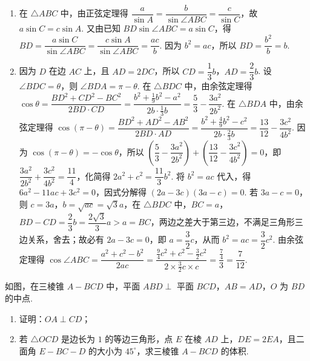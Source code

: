 \begin{solution}
\begin{enumerate}
    \item 在 \(\triangle ABC\) 中，由正弦定理得 \(\dfrac{a}{\sin A}=\dfrac{b}{\sin\angle ABC}=\dfrac{c}{\sin C}\)，故 \(a\sin C=c\sin A\). 又由已知 \(BD\sin\angle ABC=a\sin C\)，得 \(BD=\dfrac{a\sin C}{\sin\angle ABC}=\dfrac{c\sin A}{\sin\angle ABC}=\dfrac{ac}{b}\). 因为 \(b^2=ac\)，所以 \(BD=\dfrac{b^2}{b}=b\).
    \item 因为 \(D\) 在边 \(AC\) 上，且 \(AD=2DC\)，所以 \(CD=\dfrac13b\)，\(AD=\dfrac23b\). 设 \(\angle BDC=\theta\)，则 \(\angle BDA=\pi-\theta\). 在 \(\triangle BDC\) 中，由余弦定理得 \(\cos\theta=\dfrac{BD^2+CD^2-BC^2}{2BD\cdot CD}=\dfrac{b^2+\frac19b^2-a^2}{2b\cdot\frac13b}=\dfrac{5}{3}-\dfrac{3a^2}{2b^2}\). 在 \(\triangle BDA\) 中，由余弦定理得 \(\cos(\pi-\theta)=\dfrac{BD^2+AD^2-AB^2}{2BD\cdot AD}=\dfrac{b^2+\frac49b^2-c^2}{2b\cdot\frac23b}=\dfrac{13}{12}-\dfrac{3c^2}{4b^2}\). 因为 \(\cos(\pi-\theta)=-\cos\theta\)，所以 \(\left(\dfrac53-\dfrac{3a^2}{2b^2}\right)+\left(\dfrac{13}{12}-\dfrac{3c^2}{4b^2}\right)=0\)，即 \(\dfrac{3a^2}{2b^2}+\dfrac{3c^2}{4b^2}=\dfrac{11}{4}\)，化简得 \(2a^2+c^2=\dfrac{11}{3}b^2\). 将 \(b^2=ac\) 代入，得 \(6a^2-11ac+3c^2=0\)，因式分解得 \((2a-3c)(3a-c)=0\). 若 \(3a-c=0\)，则 \(c=3a\)，\(b=\sqrt{ac}=\sqrt3a\)，在 \(\triangle BDC\) 中，\(BC=a\)，\(BD-CD=\dfrac23b=\dfrac{2\sqrt3}{3}a>a=BC\)，两边之差大于第三边，不满足三角形三边关系，舍去；故必有 \(2a-3c=0\)，即 \(a=\dfrac32c\)，从而 \(b^2=ac=\dfrac32c^2\). 由余弦定理得 \(\cos\angle ABC=\dfrac{a^2+c^2-b^2}{2ac}=\dfrac{\frac94c^2+c^2-\frac32c^2}{2\times\frac32c\times c}=\dfrac{\frac74}{3}=\dfrac{7}{12}\).
\end{enumerate}
\end{solution}

\begin{problem}
如图，在三棱锥 \(A-BCD\) 中，平面 \(ABD\perp\) 平面 \(BCD\)，\(AB=AD\)，\(O\) 为 \(BD\) 的中点.

\begin{enumerate}
\item 证明：\(OA\perp CD\)；
\item 若 \(\triangle OCD\) 是边长为 \(1\) 的等边三角形，点 \(E\) 在棱 \(AD\) 上，\(DE=2EA\)，且二面角 \(E-BC-D\) 的大小为 \(45^\circ\)，求三棱锥 \(A-BCD\) 的体积.
\end{enumerate}

\end{problem}

